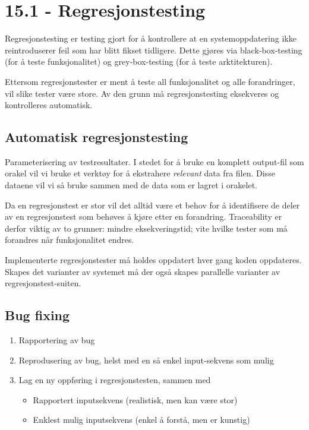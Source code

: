 \section{15.1 - Regresjonstesting}

Regresjonstesting er testing gjort for å kontrollere at en
systemoppdatering ikke reintroduserer feil som har blitt fikset
tidligere. Dette gjøres via black-box-testing (for å teste
funksjonalitet) og grey-box-testing (for å teste arktitekturen).

Ettersom regresjonstester er ment å teste all funksjonalitet og alle
forandringer, vil slike tester være store. Av den grunn må
regresjonstesting eksekveres og kontrolleres automatisk.

\subsection{Automatisk regresjonstesting}

Parameterisering av testresultater. I stedet for å bruke en komplett
output-fil som orakel vil vi bruke et verktøy for å ekstrahere
\emph{relevant} data fra filen. Disse dataene vil vi så bruke sammen med
de data som er lagret i orakelet.

Da en regresjonstest er stor vil det alltid være et behov for å
identifisere de deler av en regresjonstest som behøves å kjøre etter en
forandring. Traceability er derfor viktig av to grunner: mindre
eksekveringstid; vite hvilke tester som må forandres når funksjonalitet
endres.

Implementerte regresjonstester må holdes oppdatert hver gang koden
oppdateres. Skapes det varianter av systemet må der også skapes
parallelle varianter av regresjonstest-suiten.

\subsection{Bug fixing}

\begin{enumerate}[1.]
\item
  Rapportering av bug
\item
  Reprodusering av bug, helst med en så enkel input-sekvens som mulig
\item
  Lag en ny oppføring i regresjonstesten, sammen med
  \begin{itemize}
  \item
    Rapportert inputsekvens (realistisk, men kan være stor)
  \item
    Enklest mulig inputsekvens (enkel å forstå, men er kunstig)
  \end{itemize}
\end{enumerate}
